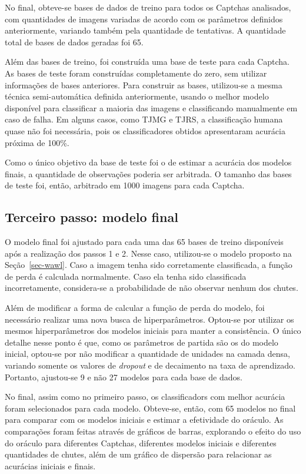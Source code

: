 \documentclass[12pt,twoside,brazilian]{book}
\begin{document}
No final, obteve-se bases de dados de treino para todos os Captchas
analisados, com quantidades de imagens variadas de acordo com os
parâmetros definidos anteriormente, variando também pela quantidade de
tentativas. A quantidade total de bases de dados geradas foi 65.

Além das bases de treino, foi construída uma base de teste para cada
Captcha. As bases de teste foram construídas completamente do zero, sem
utilizar informações de bases anteriores. Para construir as bases,
utilizou-se a mesma técnica semi-automática definida anteriormente,
usando o melhor modelo disponível para classificar a maioria das imagens
e classificando manualmente em caso de falha. Em alguns casos, como TJMG
e TJRS, a classificação humana quase não foi necessária, pois os
classificadores obtidos apresentaram acurácia próxima de 100\%.

Como o único objetivo da base de teste foi o de estimar a acurácia dos
modelos finais, a quantidade de observações poderia ser arbitrada. O
tamanho das bases de teste foi, então, arbitrado em 1000 imagens para
cada Captcha.

\hypertarget{sec-modelo-final}{%
\subsection{Terceiro passo: modelo final}\label{sec-modelo-final}}

O modelo final foi ajustado para cada uma das 65 bases de treino
disponíveis após a realização dos passos 1 e 2. Nesse caso, utilizou-se
o modelo proposto na Seção~\ref{sec-wawl}. Caso a imagem tenha sido
corretamente classificada, a função de perda é calculada normalmente.
Caso ela tenha sido classificada incorretamente, considera-se a
probabilidade de não observar nenhum dos chutes.

Além de modificar a forma de calcular a função de perda do modelo, foi
necessário realizar uma nova busca de hiperparâmetros. Optou-se por
utilizar os mesmos hiperparâmetros dos modelos iniciais para manter a
consistência. O único detalhe nesse ponto é que, como os parâmetros de
partida são os do modelo inicial, optou-se por não modificar a
quantidade de unidades na camada densa, variando somente os valores de
\emph{dropout} e de decaimento na taxa de aprendizado. Portanto,
ajustou-se 9 e não 27 modelos para cada base de dados.

No final, assim como no primeiro passo, os classificadors com melhor
acurácia foram selecionados para cada modelo. Obteve-se, então, com 65
modelos no final para comparar com os modelos iniciais e estimar a
efetividade do oráculo. As comparações foram feitas através de gráficos
de barras, explorando o efeito do uso do oráculo para diferentes
Captchas, diferentes modelos iniciais e diferentes quantidades de
chutes, além de um gráfico de dispersão para relacionar as acurácias
iniciais e finais.
\end{document}
